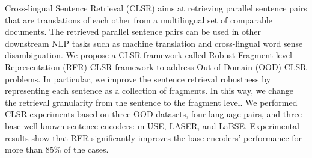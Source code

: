 Cross-lingual Sentence Retrieval (CLSR) aims at retrieving parallel sentence pairs that are translations of each other from a multilingual set of comparable documents. The retrieved parallel sentence pairs can be used in other downstream NLP tasks such as machine translation and cross-lingual word sense disambiguation. We propose a CLSR framework called Robust Fragment-level Representation (RFR) CLSR framework to address Out-of-Domain (OOD) CLSR problems. In particular, we improve the sentence retrieval robustness by representing each sentence as a collection of fragments. In this way, we change the retrieval granularity from the sentence to the fragment level. We performed CLSR experiments based on three OOD datasets, four language pairs, and three base well-known sentence encoders: m-USE, LASER, and LaBSE. Experimental results show that RFR significantly improves the base encoders' performance for more than 85\% of the cases.
